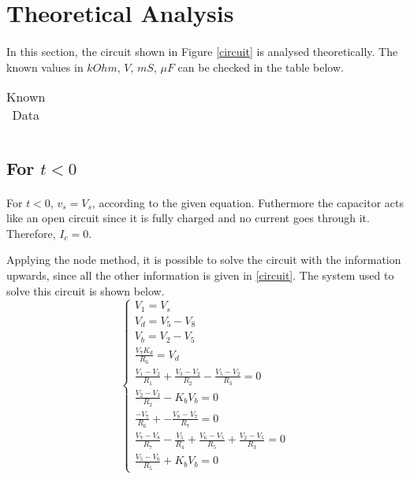 \section{Theoretical Analysis}
\label{sec:analysis}
\paragraph{}
\par In this section, the circuit shown in Figure \ref{circuit} is analysed
theoretically. The known values in $kOhm$, $V$, $mS$, $\mu F$ can be checked in the table below. 
\begin{table}[H]
    \centering
    \begin{tabular}{|c|c|}
    \hline
        
    \end{tabular}
    \caption{Known Data}
    \label{data}
\end{table}
\subsection{For $t<0$}
\paragraph{}
\par  For $t<0$, $v_s=V_s$, according to the given equation. Futhermore the capacitor acts like an open circuit since it is fully charged and no current goes through it. Therefore, $I_c = 0$.
\par Applying the node method, it is possible to solve the circuit with the information upwards, since all the other information is given in \ref{circuit}.
The system used to solve this circuit is shown below.
$$
\begin{cases} 
	V_1 = V_s \\ 
	V_d = V_5 -V_8 \\
	V_b = V_2 - V_5 \\
	\frac{V_7 K_d}{R_6} = V_d \\ 
	\frac{V_1 - V_2}{R_1} + \frac{V_3 - V_2}{R_2} - \frac{V_5 - V_2}{R_3}  = 0 \\
	\frac{V_2 - V_3}{R_2} - K_b V_b = 0 \\
	\frac{-V_7}{R_6} + -\frac{V_8 - V_7}{R_7} = 0 \\
	\frac{V_7 - V_8}{R_7} - \frac{V_5}{R_4} + \frac{V_6 - V_5}{R_5} + \frac{V_2 - V_5}{R_3}= 0 \\
	\frac{V_5 - V_6}{R_5} + K_b V_b = 0 
\label{system1}
\end{cases}
$$

